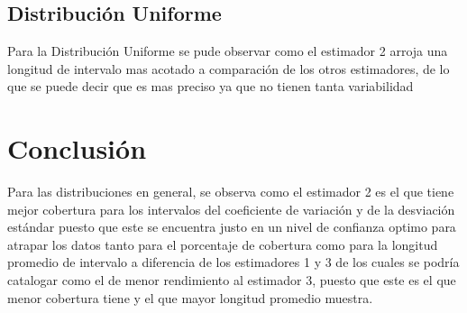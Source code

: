 \documentclass[letterpaper,12pt,onecolumn,titlepage]{article}
\begin{document}
\subsection{Distribuci\'{o}n  Uniforme}
Para la Distribuci\'{o}n  Uniforme se pude observar como el estimador 2 arroja una longitud de intervalo mas acotado a comparaci\'{o}n de los otros estimadores, de lo que se puede decir que es mas preciso ya que no tienen tanta variabilidad 

\section*{Conclusi\'{o}n}
Para las distribuciones en general, se observa como el estimador 2 es el que tiene mejor cobertura para los intervalos del coeficiente de variaci\'{o}n y de la desviaci\'{o}n est\'{a}ndar puesto que este se encuentra justo en un nivel de confianza optimo para atrapar los datos tanto para el porcentaje de cobertura como para la longitud promedio de intervalo a diferencia de los estimadores 1 y 3 de los cuales se podr\'{i}a catalogar como el de menor rendimiento al estimador 3, puesto que este es el que menor cobertura tiene y el que mayor longitud promedio muestra.  


\end{document}
